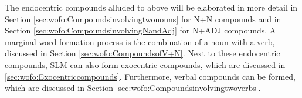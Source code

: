 The endocentric compounds alluded to above will be elaborated in more detail in Section \ref{sec:wofo:Compoundsinvolvingtwonouns} for N+N compounds and in Section \ref{sec:wofo:CompoundsinvolvingNandAdj} for N+ADJ compounds. A marginal word formation process is the combination of a noun with a verb, discussed in Section \ref{sec:wofo:CompoundsofV+N}. Next to these endocentric compounds,  SLM can also form exocentric compounds, which are discussed in \ref{sec:wofo:Exocentriccompounds}. Furthermore, verbal compounds can be formed, which are discussed in Section \ref{sec:wofo:Compoundsinvolvingtwoverbs}.



% 
% 
% 

% 


